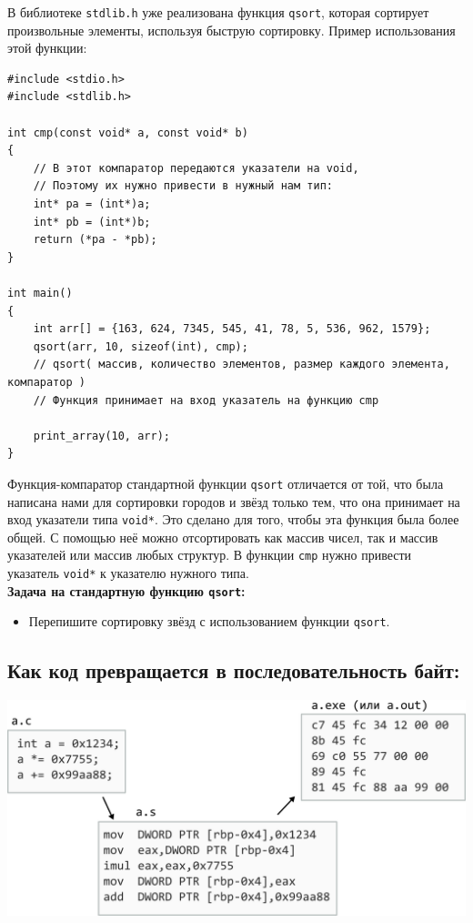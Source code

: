 \documentclass{article}
\begin{document}
В библиотеке \texttt{stdlib.h} уже реализована функция \texttt{qsort}, которая сортирует произвольные элементы, используя быструю сортировку. Пример использования этой функции:
\begin{lstlisting}
#include <stdio.h>
#include <stdlib.h>

int cmp(const void* a, const void* b)
{
    // В этот компаратор передаются указатели на void,
    // Поэтому их нужно привести в нужный нам тип:
    int* pa = (int*)a;
    int* pb = (int*)b;
    return (*pa - *pb);
}

int main()
{
    int arr[] = {163, 624, 7345, 545, 41, 78, 5, 536, 962, 1579};
    qsort(arr, 10, sizeof(int), cmp);
    // qsort( массив, количество элементов, размер каждого элемента, компаратор )
    // Функция принимает на вход указатель на функцию cmp
   
    print_array(10, arr);
}
\end{lstlisting}
Функция-компаратор стандартной функции \texttt{qsort} отличается от той, что была написана нами для сортировки
городов и звёзд только тем, что она принимает на вход указатели типа \texttt{void*}. Это сделано для того, чтобы эта функция была более общей. С помощью неё можно отсортировать как массив чисел, так и массив указателей или массив любых структур. В функции \texttt{cmp} нужно привести указатель \texttt{void*} к указателю нужного типа.\\
\textbf{Задача на стандартную функцию \texttt{qsort}:}
\begin{itemize}
\item Перепишите сортировку звёзд с использованием функции \texttt{qsort}.
\end{itemize}
\newpage
\subsection*{Как код превращается в последовательность байт:}
\begin{center}
\includegraphics[scale=0.9]{../images/code_to_hex.png}
\end{center}
\end{document}

